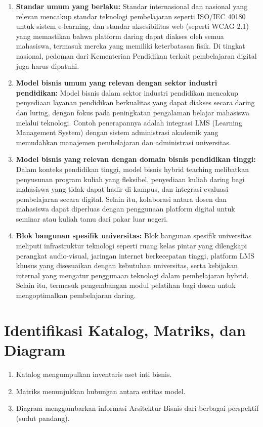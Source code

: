 \begin{enumerate}
	\item \textbf{Standar umum yang berlaku:}  
	Standar internasional dan nasional yang relevan mencakup standar teknologi pembelajaran seperti ISO/IEC 40180 untuk sistem e-learning, dan standar aksesibilitas web (seperti WCAG 2.1) yang memastikan bahwa platform daring dapat diakses oleh semua mahasiswa, termasuk mereka yang memiliki keterbatasan fisik. Di tingkat nasional, pedoman dari Kementerian Pendidikan terkait pembelajaran digital juga harus dipatuhi.
	
	\item \textbf{Model bisnis umum yang relevan dengan sektor industri pendidikan:}  
	Model bisnis dalam sektor industri pendidikan mencakup penyediaan layanan pendidikan berkualitas yang dapat diakses secara daring dan luring, dengan fokus pada peningkatan pengalaman belajar mahasiswa melalui teknologi. Contoh penerapannya adalah integrasi LMS (Learning Management System) dengan sistem administrasi akademik yang memudahkan manajemen pembelajaran dan administrasi universitas.
	
	\item \textbf{Model bisnis yang relevan dengan domain bisnis pendidikan tinggi:}  
	Dalam konteks pendidikan tinggi, model bisnis hybrid teaching melibatkan penyusunan program kuliah yang fleksibel, penyediaan kuliah daring bagi mahasiswa yang tidak dapat hadir di kampus, dan integrasi evaluasi pembelajaran secara digital. Selain itu, kolaborasi antara dosen dan mahasiswa dapat diperluas dengan penggunaan platform digital untuk seminar atau kuliah tamu dari pakar luar negeri.
	
	\item \textbf{Blok bangunan spesifik universitas:}  
	Blok bangunan spesifik universitas meliputi infrastruktur teknologi seperti ruang kelas pintar yang dilengkapi perangkat audio-visual, jaringan internet berkecepatan tinggi, platform LMS khusus yang disesuaikan dengan kebutuhan universitas, serta kebijakan internal yang mengatur penggunaan teknologi dalam pembelajaran hybrid. Selain itu, termasuk pengembangan modul pelatihan bagi dosen untuk mengoptimalkan pembelajaran daring.
\end{enumerate}


\section{Identifikasi Katalog, Matriks, dan Diagram}
\begin{enumerate}
	\item Katalog mengumpulkan inventaris aset inti bisnis.
	\item Matriks menunjukkan hubungan antara entitas model.
	\item Diagram menggambarkan informasi Arsitektur Bisnis dari berbagai perspektif (sudut pandang).
\end{enumerate}

